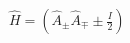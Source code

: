 \documentclass[preview]{standalone}
\begin{document}
\begin{center}
$\hat{H} = \left(\hat{A}_{\pm}\hat{A}_{\mp} \pm \frac{I}{2}\right)$
\end{center}
\end{document}
